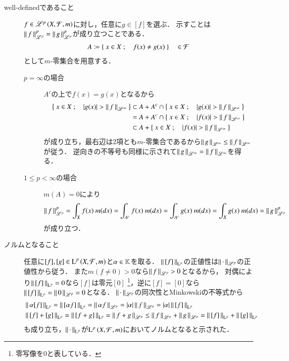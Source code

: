 \begin{prf}\mbox{}
	\begin{description}
		\item[well-definedであること]
			$f \in \mathscr{L}^{p} \left(X,\mathcal{F},m\right)$に対し，任意に$g \in [f]$を選ぶ．
			示すことは$\left\|\, f\, \right\|_{\mathscr{L}^p}^p = \left\|\, g\, \right\|_{\mathscr{L}^p}^p$が成り立つことである．
			\begin{align}
				A \coloneqq \left\{\ x \in X\ ;\quad f(x) \neq g(x)\ \right\} \quad \in \mathcal{F}
			\end{align}
			として$m$-零集合を用意する．
			\begin{description}
				\item[$p = \infty$の場合]
					$A^c$の上で$f(x)=g(x)$となるから
					\begin{align}
						\left\{\ x \in X\ ;\quad |g(x)| > \left\|\, f\, \right\|_{\mathscr{L}^\infty}\ \right\} 
						&\subset A + A^c \cap \left\{\ x \in X\ ;\quad |g(x)| > \left\|\, f\, \right\|_{\mathscr{L}^\infty}\ \right\} \\
						&= A + A^c \cap \left\{\ x \in X\ ;\quad |f(x)| > \left\|\, f\, \right\|_{\mathscr{L}^\infty}\ \right\} \\
						&\subset A + \left\{\ x \in X\ ;\quad |f(x)| > \left\|\, f\, \right\|_{\mathscr{L}^\infty}\ \right\}
					\end{align}
					が成り立ち，最右辺は2項とも$m$-零集合であるから$\left\|\, g\, \right\|_{\mathscr{L}^\infty} \leq \left\|\, f\, \right\|_{\mathscr{L}^\infty}$が従う．
					逆向きの不等号も同様に示されて$\left\|\, g\, \right\|_{\mathscr{L}^\infty} = \left\|\, f\, \right\|_{\mathscr{L}^\infty}$を得る．
				\item[$1 \leq p < \infty$の場合]
					$m(A)=0$により
					\begin{align}
						\left\|\, f\, \right\|_{\mathscr{L}^p}^p = \int_X f(x)\ m(dx) = \int_{A^c} f(x)\ m(dx) = \int_{A^c} g(x)\ m(dx) = \int_X g(x)\ m(dx) = \left\|\, g\, \right\|_{\mathscr{L}^p}^p
					\end{align}
					が成り立つ．
			\end{description}
		
		\item[ノルムとなること]
			任意に$[f],[g] \in \operatorname{L}^{p} \left(X,\mathcal{F},m\right)$と$\alpha \in \mathbb{K}$を取る．
			$\left\|\, [f]\, \right\|_{\mathrm{L}^p}$の正値性は$\left\|\, \cdot\, \right\|_{\mathscr{L}^p}$の正値性から従う．
			また$m(f \neq 0) > 0$なら$\left\|\, f\, \right\|_{\mathscr{L}^p} > 0$となるから，
			対偶により$\left\|\, [f]\, \right\|_{\mathrm{L}^p} = 0$なら$[f]$は零元$[0]$
			\footnote{
				零写像を$0$と表している．
			}，逆に$[f] = [0]$なら$\left\|\, [f]\, \right\|_{\mathrm{L}^p} = \left\|\, 0\, \right\|_{\mathscr{L}^p} = 0$となる．
			$\left\|\, \cdot\, \right\|_{\mathscr{L}^p}$の同次性とMinkowskiの不等式から
			\begin{align}
				&\left\|\, \alpha[f]\, \right\|_{\mathrm{L}^p} = \left\|\, [\alpha f]\, \right\|_{\mathrm{L}^p} = \left\|\, \alpha f\, \right\|_{\mathscr{L}^p} = |\alpha|\left\|\, f\, \right\|_{\mathscr{L}^p} = |\alpha|\left\|\, [f]\, \right\|_{\mathrm{L}^p} \\
				&\left\|\, [f] + [g]\, \right\|_{\mathrm{L}^p} = \left\|\, [f + g]\, \right\|_{\mathrm{L}^p} = \left\|\, f + g\, \right\|_{\mathscr{L}^p} \leq \left\|\, f\, \right\|_{\mathscr{L}^p} + \left\|\, g\, \right\|_{\mathscr{L}^p} = \left\|\, [f]\, \right\|_{\mathrm{L}^p} + \left\|\, [g]\, \right\|_{\mathrm{L}^p}
			\end{align}
			も成り立ち，$\left\|\, \cdot\, \right\|_{\mathrm{L}^p}$が$\operatorname{L}^{p} \left(X,\mathcal{F},m\right)$においてノルムとなると示された．
	\end{description}
	\QED
\end{prf}

